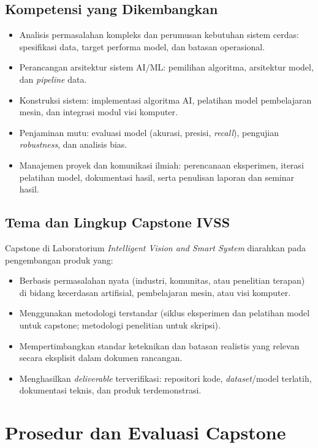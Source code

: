 \documentclass[12pt,a4paper]{report}
\begin{document}
\section{Kompetensi yang Dikembangkan}
\begin{itemize}
\item Analisis permasalahan kompleks dan perumusan kebutuhan sistem cerdas: spesifikasi data, target performa model, dan batasan operasional.
\item Perancangan arsitektur sistem AI/ML: pemilihan algoritma, arsitektur model, dan \emph{pipeline} data.
\item Konstruksi sistem: implementasi algoritma AI, pelatihan model pembelajaran mesin, dan integrasi modul visi komputer.
\item Penjaminan mutu: evaluasi model (akurasi, presisi, \emph{recall}), pengujian \emph{robustness}, dan analisis bias.
\item Manajemen proyek dan komunikasi ilmiah: perencanaan eksperimen, iterasi pelatihan model, dokumentasi hasil, serta penulisan laporan dan seminar hasil.
\end{itemize}

\section{Tema dan Lingkup Capstone IVSS}
Capstone di Laboratorium \emph{Intelligent Vision and Smart System} diarahkan pada pengembangan produk yang:
\begin{itemize}
\item Berbasis permasalahan nyata (industri, komunitas, atau penelitian terapan) di bidang kecerdasan artifisial, pembelajaran mesin, atau visi komputer.
\item Menggunakan metodologi terstandar (siklus eksperimen dan pelatihan model untuk capstone; metodologi penelitian untuk skripsi).
\item Mempertimbangkan standar keteknikan dan batasan realistis yang relevan secara eksplisit dalam dokumen rancangan.
\item Menghasilkan \emph{deliverable} terverifikasi: repositori kode, \emph{dataset}/model terlatih, dokumentasi teknis, dan produk terdemonstrasi.
\end{itemize}

\chapter{Prosedur dan Evaluasi Capstone}
\end{document}
